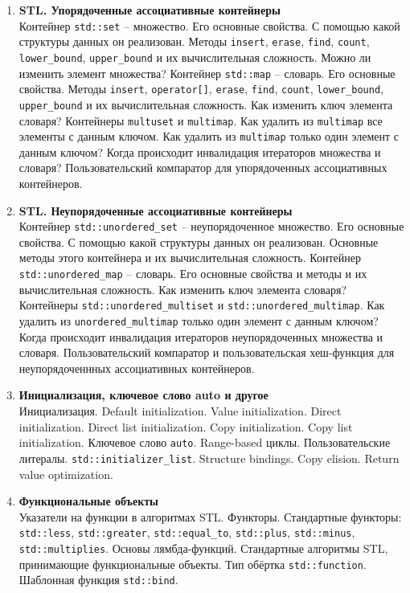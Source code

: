 \documentclass{article}
\begin{document}
\begin{enumerate}
\item \textbf{STL. Упорядоченные ассоциативные контейнеры}\\
Контейнер \texttt{std::set} -- множество. Его основные свойства. С помощью какой структуры данных он реализован. Методы \texttt{insert}, \texttt{erase}, \texttt{find}, \texttt{count}, \texttt{lower\_bound}, \texttt{upper\_bound} и их вычислительная сложность. Можно ли изменить элемент множества? Контейнер \texttt{std::map} -- словарь. Его основные свойства. Методы \texttt{insert}, \texttt{operator[]}, \texttt{erase}, \texttt{find}, \texttt{count}, \texttt{lower\_bound}, \texttt{upper\_bound} и их вычислительная сложность. Как изменить ключ элемента словаря? Контейнеры \texttt{multuset} и \texttt{multimap}. Как удалить из \texttt{multimap} все элементы с данным ключом. Как удалить из \texttt{multimap} только один элемент с данным ключом? Когда происходит инвалидация итераторов множества и словаря? Пользовательский компаратор для упорядоченных ассоциативных контейнеров. 

\item \textbf{STL. Неупорядоченные ассоциативные контейнеры}\\
Контейнер \texttt{std::unordered\_set} -- неупорядоченное множество. Его основные свойства. С помощью какой структуры данных он реализован. Основные методы этого контейнера и их вычислительная сложность. Контейнер \texttt{std::unordered\_map} -- словарь. Его основные свойства и методы и их вычислительная сложность. Как изменить ключ элемента словаря? Контейнеры \texttt{std::unordered\_multiset} и \texttt{std::unordered\_multimap}. Как удалить из \texttt{unordered\_multimap} только один элемент с данным ключом? Когда происходит инвалидация итераторов неупорядоченных множества и словаря.  Пользовательский компаратор и пользовательская хеш-функция для неупорядоченнных ассоциативных контейнеров.

\item \textbf{Инициализация, ключевое слово auto и другое}\\
Инициализация. Default initialization. Value initialization. Direct initialization. Direct list initialization. Copy initialization. Copy list initialization. Ключевое слово \texttt{auto}. Range-based циклы. Пользовательские литералы. \texttt{std::initializer\_list}. Structure bindings. Copy elision. Return value optimization.


\item \textbf{Функциональные объекты}\\
Указатели на функции в алгоритмах STL. Функторы. Стандартные функторы: \texttt{std::less}, \texttt{std::greater}, \texttt{std::equal\_to}, \texttt{std::plus}, \texttt{std::minus}, \texttt{std::multiplies}. Основы лямбда-функций. Стандартные алгоритмы STL, принимающие функциональные объекты. Тип обёртка \texttt{std::function}. Шаблонная функция \texttt{std::bind}.


\end{enumerate}
\end{document}
